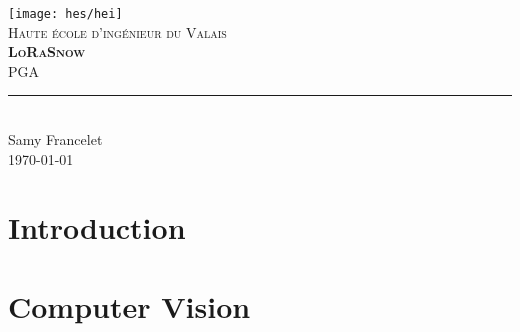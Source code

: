 \documentclass[11pt,titlepage]{report}
\begin{document}
\begin{titlepage}
	\centering
    \texttt{[image: hes/hei]}\\[1cm] 	%
    \textsc{\LARGE Haute école d'ingénieur du Valais}\\ \vspace{\fill}
    \textbf{\textsc{\fontsize{35}{35}\selectfont LoRaSnow}}\\ \vspace{\fill}
	\textsc{\LARGE PGA}\\[0.4cm]
	\rule{\linewidth}{0.2 mm} \\[0.5 cm]
	Samy Francelet \\
	\today
\end{titlepage}
\restoregeometry

\tableofcontents

\chapter{Introduction}


\chapter{Computer Vision}




\printbibliography[heading=bibintoc]
\end{document}
